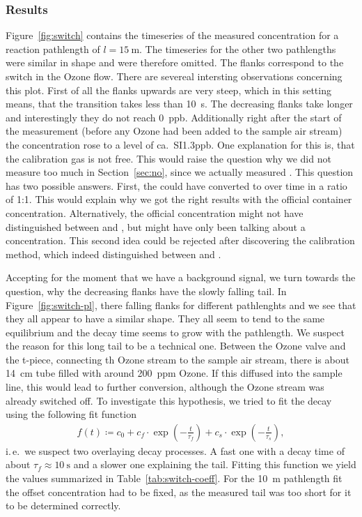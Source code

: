 \subsubsection{Results}
\label{sec:switch-results}

Figure~\ref{fig:switch} contains the timeseries of the measured
 concentration for a reaction pathlength of $l =
\SI{15}{\meter}$. The timeseries for the other two pathlengths were
similar in shape and were therefore omitted. The flanks correspond to
the switch in the Ozone flow. There are severeal intersting
observations concerning this plot. First of all the flanks upwards are
very steep, which in this setting means, that the transition takes
less than \SI{10}{\second}. The decreasing flanks take longer and
interestingly they do not reach \SI{0}{ppb}. Additionally right after
the start of the measurement (before any Ozone had been added to the
sample air stream) the concentration rose to a level of ca.\
SI{1.3}{ppb}. One explanation for this is, that the calibration gas is
not \ch{NO2} free. This would raise the question why we did not
measure too much  in Section~\ref{sec:no}, since we actually
measured \ch{NO_x}. This question has two possible answers. First, the
\ch{NO} could have converted to \ch{NO2} over time in a ratio of
1:1. This would explain why we got the right results with the official
container concentration. Alternatively, the official concentration
might not have distinguished between \ch{NO} and \ch{NO2}, but might
have only been talking about a \ch{NO_x} concentration. This second
idea could be rejected after discovering the calibration method, which
indeed distinguished between \ch{NO} and .

Accepting for the moment that we have a background \ch{NO2} signal, we
turn towards the question, why the decreasing flanks have the slowly
falling tail. In Figure~\ref{fig:switch-pl}, there falling flanks for
different pathlenghts and we see that they all appear to have a
similar shape. They all seem to tend to the same equilibrium and the
decay time seems to grow with the pathlength. We suspect the reason
for this long tail to be a technical one. Between the Ozone valve and
the t-piece, connecting th Ozone stream to the sample air stream,
there is about \SI{14}{\centi\meter} tube filled with around
\SI{200}{ppm} Ozone. If this diffused into the sample line, this would
lead to further \ch{NO} conversion, although the Ozone stream was
already switched off. To investigate this hypothesis, we tried to fit
the decay using the following fit function
\begin{align}
  f(t) \coloneqq c_0 + c_f \cdot\exp\left( -\frac{t}{\tau_f}\right) +
  c_s \cdot \exp\left(-\frac{t}{\tau_s}\right), \label{eq:switch-fit}
\end{align}
i.\,e.\ we suspect two overlaying decay processes. A fast one with a
decay time of about $\tau_f \approx \SI{10}{\second}$ and a slower one
explaining the tail. Fitting this function we yield the values
summarized in Table~\ref{tab:switch-coeff}. For the \SI{10}{\meter}
pathlength fit the offset concentration had to be fixed, as the
measured tail was too short for it to be determined correctly. 


